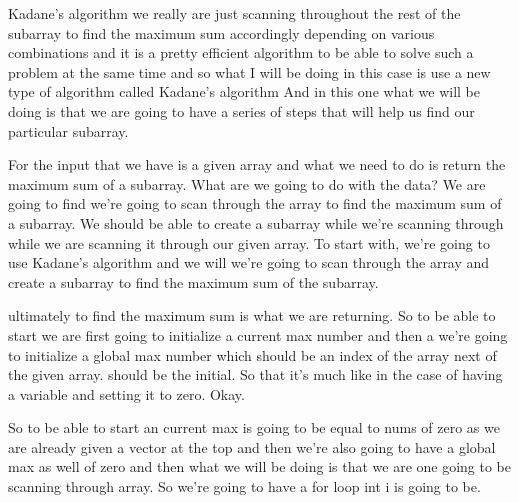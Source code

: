 
\expandafter\def\csname sourceexcerpt@26\endcsname{%
Kadane's algorithm we really are just scanning throughout
the rest of the subarray to find the maximum sum accordingly depending on various
combinations and it is a pretty efficient algorithm to be able to solve such a problem
at the same time and so what I will be doing in this case is use a
new type of algorithm called Kadane's algorithm And in this one what we will be doing
is that we are going to have a series of steps that will help us find our particular
subarray.

For the input that we have is a given array and what we need to do is return the
maximum sum of a subarray. What are we going to do with the data? We are going to find
we're going to scan through the array to find the maximum sum of a subarray. We should
be able to create a subarray while we're scanning through while we are scanning it
through our given array. To start with, we're going to use Kadane's algorithm and we
will we're going to scan through the array and create a subarray to find the maximum
sum of the subarray.

ultimately to find the maximum sum is what we are returning. So to be able to start we
are first going to initialize a current max number and then a we're going to
initialize a global max number which should be an index of the array next of the given
array. should be the initial. So that it's much like in the case of having a variable
and setting it to zero. Okay.

So to be able to start an current max is going to be equal to nums of zero as we are
already given a vector at the top and then we're also going to have a global max as
well of zero and then what we will be doing is that we are one going to be scanning
through array. So we're going to have a for loop int i is going to be.
}

